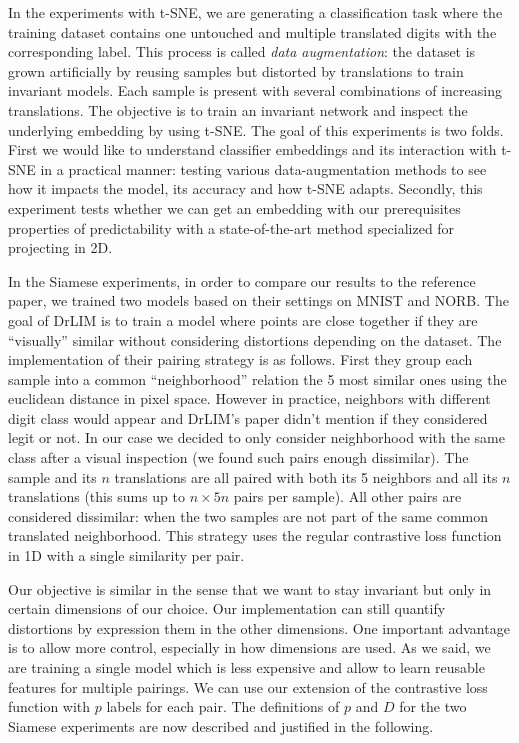 \documentclass[a4paper,12pt]{report}
\begin{document}
In the experiments with t-SNE, we are generating a classification task where the training dataset contains one untouched and multiple translated digits with the corresponding label.
This process is called {\em data augmentation}: the dataset is grown artificially by reusing samples but distorted by translations to train invariant models.
Each sample is present with several combinations of increasing translations.
The objective is to train an invariant network and inspect the underlying embedding by using t-SNE.
The goal of this experiments is two folds.
First we would like to understand classifier embeddings and its interaction with t-SNE in a practical manner: testing various data-augmentation methods to see how it impacts the model, its accuracy and how t-SNE adapts.
Secondly, this experiment tests whether we can get an embedding with our prerequisites properties of predictability with a state-of-the-art method specialized for projecting in 2D.

In the Siamese experiments, in order to compare our results to the reference paper, we trained two models based on their settings on MNIST and NORB.
The goal of DrLIM is to train a model where points are close together if they are ``visually'' similar without considering distortions depending on the dataset.
The implementation of their pairing strategy is as follows.
First they group each sample into a common ``neighborhood'' relation the 5 most similar ones using the euclidean distance in pixel space.
However in practice, neighbors with different digit class would appear and DrLIM's paper didn't mention if they considered legit or not.
In our case we decided to only consider neighborhood with the same class after a visual inspection (we found such pairs enough dissimilar).
The sample and its $n$ translations are all paired with both its 5 neighbors and all its $n$ translations (this sums up to $n \times 5n$ pairs per sample).
All other pairs are considered dissimilar: when the two samples are not part of the same common translated neighborhood.
This strategy uses the regular contrastive loss function in 1D with a single similarity per pair.

Our objective is similar in the sense that we want to stay invariant but only in certain dimensions of our choice.
Our implementation can still quantify distortions by expression them in the other dimensions.
One important advantage is to allow more control, especially in how dimensions are used.
As we said, we are training a single model which is less expensive and allow to learn reusable features for multiple pairings.
We can use our extension of the contrastive loss function with $p$ labels for each pair.
The definitions of $p$ and $D$ for the two Siamese experiments are now described and justified in the following.
\end{document}
